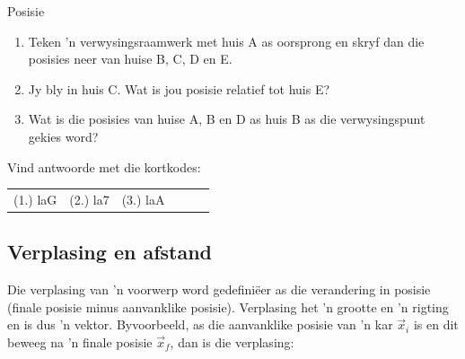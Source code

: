 \begin{exercises}{Posisie}
\begin{enumerate}[noitemsep, label=\textbf{\arabic*}. ]
\begin{enumerate}[noitemsep, label=\textbf{\alph*}. ] 
    \item Teken 'n verwysingsraamwerk met huis A as oorsprong en skryf dan die posisies neer van huise B, C, D en E.
    \item Jy bly in huis C. Wat is jou posisie relatief tot huis E?
    \item Wat is die posisies van huise A, B en D as huis B as die verwysingspunt gekies word?
\end{enumerate}
\end{enumerate}

\par {} Vind antwoorde met die kortkodes: 
 \par \begin{tabular}[h]{cccccc}
 (1.) laG  &  (2.) la7  &  (3.) laA  & \end{tabular}
\end{exercises}

\subsection*{Verplasing en afstand}
    \nopagebreak
{}

Die verplasing van 'n voorwerp word gedefini\"eer as die verandering in posisie (finale posisie minus aanvanklike posisie). Verplasing het 'n grootte en 'n rigting en is dus 'n vektor. Byvoorbeeld, as die aanvanklike posisie van 'n kar $\vec{x}_{i}$ is en dit beweeg na 'n finale posisie $\vec{x}_{f}$, dan is die verplasing:

        
